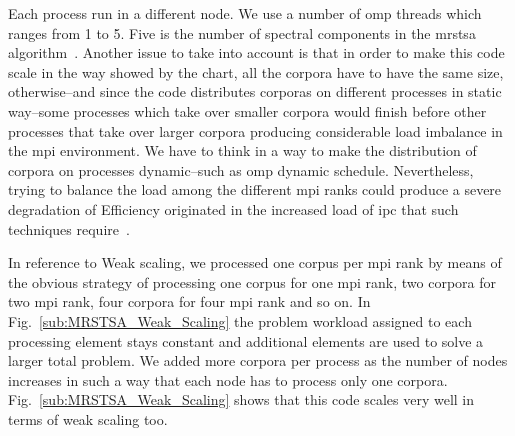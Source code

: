 \documentclass[10pt,journal,compsoc]{IEEEtran}
\begin{document}

Each process run in a different node. We use a number of \gls{omp} threads which ranges from 1 to 5. Five is the number of spectral components in the \gls{mrstsa} algorithm~\cite{Dematties2018}. Another issue to take into account is that in order to make this code scale in the way showed by the chart, all the corpora have to have the same size, otherwise--and since the code distributes corporas on different processes in static way--some processes which take over smaller corpora would finish before other processes that take over larger corpora producing considerable load imbalance in the \gls{mpi} environment. We have to think in a way to make the distribution of corpora on processes dynamic--such as \gls{omp} dynamic schedule. Nevertheless, trying to balance the load among the different \gls{mpi} ranks could produce a severe degradation of Efficiency originated in the increased load of \gls{ipc} that such techniques require~\cite{hu2012biophysically}.

In reference to Weak scaling, we processed one corpus per \gls{mpi} rank by means of the obvious strategy of processing one corpus for one \gls{mpi} rank, two corpora for two \gls{mpi} rank, four corpora for four \gls{mpi} rank and so on. In Fig.~\ref{sub:MRSTSA_Weak_Scaling} the problem workload assigned to each processing element stays constant and additional elements are used to solve a larger total problem. We added more corpora per process as the number of nodes increases in such a way that each node has to process only one corpora. Fig.~\ref{sub:MRSTSA_Weak_Scaling} shows that this code scales very well in terms of weak scaling too.
\end{document}
